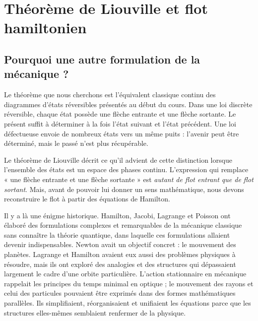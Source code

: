 \chapter{Théorème de Liouville et flot hamiltonien}


\section{Pourquoi une autre formulation de la mécanique ?}

Le théorème que nous cherchons est l’équivalent classique continu des diagrammes d’états réversibles présentés au début du cours. Dans une loi discrète réversible, chaque état possède une flèche entrante et une flèche sortante. Le présent suffit à déterminer à la fois l’état suivant et l’état précédent. Une loi défectueuse envoie de nombreux états vers un même puits : l’avenir peut être déterminé, mais le passé n’est plus récupérable.

Le théorème de Liouville décrit ce qu’il advient de cette distinction lorsque l’ensemble des états est un espace des phases continu. L’expression qui remplace « une flèche entrante et une flèche sortante » est \emph{autant de flot entrant que de flot sortant}. Mais, avant de pouvoir lui donner un sens mathématique, nous devons reconstruire le flot à partir des équations de Hamilton.

Il y a là une énigme historique. Hamilton, Jacobi, Lagrange et Poisson ont élaboré des formulations complexes et remarquables de la mécanique classique sans connaître la théorie quantique, dans laquelle ces formulations allaient devenir indispensables. Newton avait un objectif concret : le mouvement des planètes. Lagrange et Hamilton avaient eux aussi des problèmes physiques à résoudre, mais ils ont exploré des analogies et des structures qui dépassaient largement le cadre d’une orbite particulière. L’action stationnaire en mécanique rappelait les principes du temps minimal en optique ; le mouvement des rayons et celui des particules pouvaient être exprimés dans des formes mathématiques parallèles. Ils simplifiaient, réorganisaient et unifiaient les équations parce que les structures elles-mêmes semblaient renfermer de la physique.

